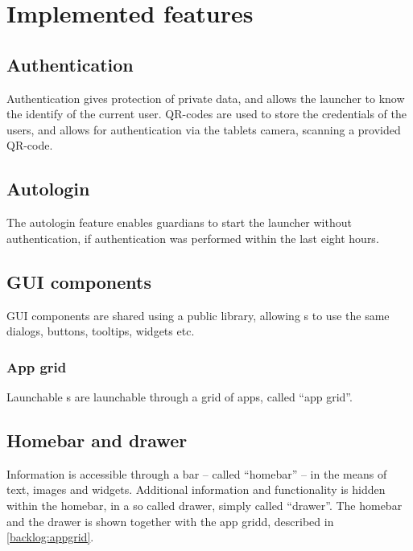 \section{Implemented features}
\label{backlog_implemented}

%
\subsection{Authentication}
\label{backlog:authentication}
Authentication gives protection of private data, and allows the launcher to know the identify of the current user.
QR-codes are used to store the credentials of the users, and allows for authentication via the tablets camera, scanning a provided QR-code.

\subsection{Autologin}
\label{backlog:autologin}
The autologin feature enables guardians to start the launcher without authentication, if authentication was performed within the last eight hours.

%
\subsection{GUI components}
\label{backlog:GUI_components}
GUI components are shared using a public library, allowing \girafapp[]s to use the same dialogs, buttons, tooltips, widgets etc.

\subsubsection{App grid}
\label{backlog:appgrid}
Launchable \girafapp[]s are launchable through a grid of apps, called ``app grid''.

%
\subsection{Homebar and drawer}
\label{backlog:homebar_drawer}
Information is accessible through a bar -- called ``homebar'' -- in the means of text, images and widgets.
Additional information and functionality is hidden within the homebar, in a so called drawer, simply called ``drawer''. The homebar and the drawer is shown together with the app gridd, described in \autoref{backlog:appgrid}.

